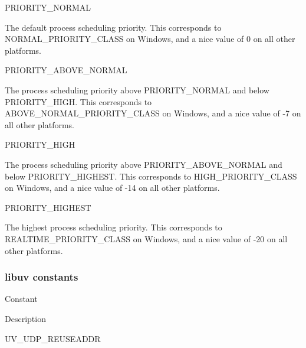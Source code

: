 PRIORITY\_NORMAL

The default process scheduling priority. This corresponds to
NORMAL\_PRIORITY\_CLASS on Windows, and a nice value of 0 on all other
platforms.

PRIORITY\_ABOVE\_NORMAL

The process scheduling priority above PRIORITY\_NORMAL and below
PRIORITY\_HIGH. This corresponds to ABOVE\_NORMAL\_PRIORITY\_CLASS on
Windows, and a nice value of -7 on all other platforms.

PRIORITY\_HIGH

The process scheduling priority above PRIORITY\_ABOVE\_NORMAL and below
PRIORITY\_HIGHEST. This corresponds to HIGH\_PRIORITY\_CLASS on Windows,
and a nice value of -14 on all other platforms.

PRIORITY\_HIGHEST

The highest process scheduling priority. This corresponds to
REALTIME\_PRIORITY\_CLASS on Windows, and a nice value of -20 on all
other platforms.

\subsubsection{libuv constants}\label{libuv-constants}

Constant

Description

UV\_UDP\_REUSEADDR
